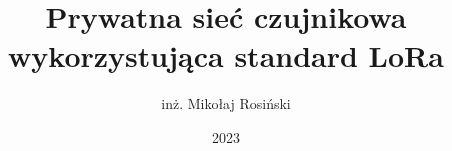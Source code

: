 \documentclass[thesis=mgr,faculty=ee]{EE-dyplom}
\title{Prywatna sieć czujnikowa wykorzystująca standard LoRa}
\author{inż. Mikołaj Rosiński}
\date{2023}
\begin{document}
\frontpages



\bibliografia

\acronymslist
\listoffigures
\listoftables
\end{document}
